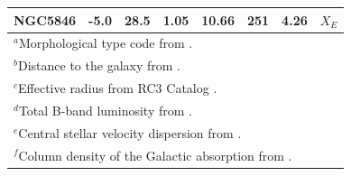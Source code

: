 \documentclass[structabstract]{aa}
\begin{document}
\begin{table}
\begin{tabular}{lccccccl}
NGC5846 & -5.0 & 28.5 & 1.05 & 10.66 & 251 & 4.26 & $X_E$\\
\hline
\multicolumn{8}{l}{$^a$Morphological type code from \citet{Tully1988}.}\\
\multicolumn{8}{l}{$^b$Distance to the galaxy from \citet{Tully1988}.}\\
\multicolumn{8}{l}{$^c$Effective radius from RC3 Catalog 
 \citep{deVau1991}.}\\
\multicolumn{8}{l}{$^d$Total B-band luminosity from \citet{Tully1988}.}\\
\multicolumn{8}{l}{$^e$Central stellar velocity dispersion from
 \citet{Prug1996}.}\\
\multicolumn{8}{l}{$^f$Column density of the Galactic absorption from
 \citet{Dick1990}.}\\
\end{tabular}
\end{table}
\end{document}

